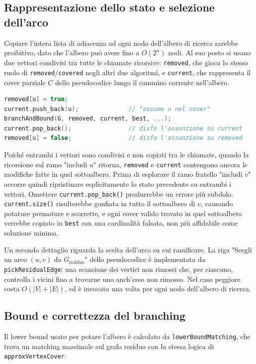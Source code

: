 \subsection{Rappresentazione dello stato e selezione dell'arco} Copiare l'intera lista di adiacenza 
ad ogni nodo dell'albero di ricerca sarebbe proibitivo, 
dato che l'albero può avere fino a $O(2^n)$ nodi. Al suo posto si usano due vettori condivisi 
tra tutte le chiamate ricorsive: \texttt{removed}, che gioca lo stesso ruolo di \texttt{removed}/\texttt{covered} 
negli altri due algoritmi, e \texttt{current}, che rappresenta il cover parziale $C$ 
dello pseudocodice lungo il cammino corrente nell'albero.

\begin{lstlisting}[language=C++, caption={Branching con backtracking su \texttt{removed} e \texttt{current} (\texttt{src/exact\_branch\_and\_bound.cpp})}]
removed[u] = true;
current.push_back(u);              // "assumo u nel cover"
branchAndBound(G, removed, current, best, ...);
current.pop_back();                // disfo l'assunzione su current
removed[u] = false;                // disfo l'assunzione su removed
\end{lstlisting}

Poiché entrambi i vettori sono condivisi e non copiati tra le chiamate, 
quando la ricorsione sul ramo "includi $u$" ritorna, 
\texttt{removed} e \texttt{current} contengono ancora le modifiche fatte in quel sottoalbero. 
Prima di esplorare il ramo fratello "includi $v$" occorre quindi ripristinare esplicitamente 
lo stato precedente su entrambi i vettori.
Omettere \texttt{current.pop\_back()} produrrebbe un errore più subdolo. 
\texttt{current.size()} risulterebbe gonfiata in tutto il sottoalbero di $v$, 
causando potature premature e scorrette, e ogni cover valido trovato in quel sottoalbero 
verrebbe copiato in \texttt{best} con una cardinalità falsata, non più affidabile come soluzione minima.

Un secondo dettaglio riguarda la scelta dell'arco su cui ramificare. 
La riga "Scegli un arco $(u,v)$ da $G_{\text{residuo}}$" dello pseudocodice è implementata da 
\texttt{pickResidualEdge}: una scansione dei vertici non rimossi che, per ciascuno, 
controlla i vicini fino a trovarne uno anch'esso non rimosso. 
Nel caso peggiore costa $O(|V|+|E|)$, ed è invocata una volta per ogni nodo dell'albero di ricerca.

\subsection{Bound e correttezza del branching} Il lower bound usato per potare l'albero è calcolato 
da \texttt{lowerBoundMatching}, che trova un matching massimale sul grafo residuo con la stessa 
logica di \texttt{approxVertexCover}.

